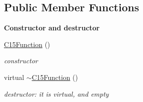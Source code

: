 \subsection*{Public Member Functions}
\begin{Indent}\textbf{ Constructor and destructor}\par
\begin{DoxyCompactItemize}
\item 
\mbox{\label{class_s_m_spp__di__unipi__it_1_1_c15_function_a2c367c763878de8889b4011fb0e5c500}} 
\mbox{\hyperlink{class_s_m_spp__di__unipi__it_1_1_c15_function_a2c367c763878de8889b4011fb0e5c500}{C15\+Function}} ()
\begin{DoxyCompactList}\small\item\em constructor \end{DoxyCompactList}\item 
\mbox{\label{class_s_m_spp__di__unipi__it_1_1_c15_function_a80a86131359bdee1790c3b0eeee4aa3c}} 
virtual \mbox{\hyperlink{class_s_m_spp__di__unipi__it_1_1_c15_function_a80a86131359bdee1790c3b0eeee4aa3c}{$\sim$\+C15\+Function}} ()
\begin{DoxyCompactList}\small\item\em destructor\+: it is virtual, and empty \end{DoxyCompactList}\end{DoxyCompactItemize}
\end{Indent}
